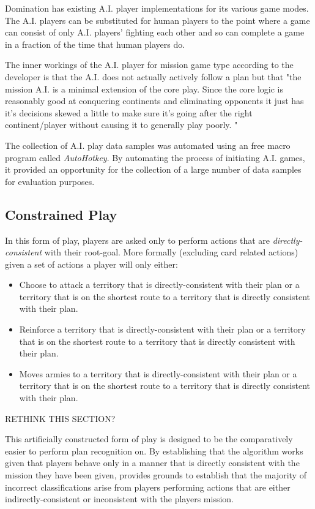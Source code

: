 \documentclass[parskip]{cs4rep}
\begin{document}
Domination has existing A.I. player implementations for its various game modes. The A.I. players can be substituted for human players to the point where a game can consist of only A.I. players' fighting each other and so can complete a game in a fraction of the time that human players do. 

The inner workings of the A.I. player for mission game type according to the developer is that the A.I. does not actually actively follow a plan but that "the mission A.I. is a minimal extension of the core play. Since the core logic is reasonably good at conquering continents and eliminating opponents it just has it's decisions skewed a little to make sure it's going after the right continent/player without causing it to generally play poorly. "

The collection of A.I. play data samples was automated using an free macro program called \textit{AutoHotkey}. By automating the process of initiating A.I. games, it provided an opportunity for the collection of a large number of data samples for evaluation purposes. 

\subsection{Constrained Play}

In this form of play, players are asked only to perform actions that are \textit{directly-consistent} with their root-goal.  More formally (excluding card related actions) given a set of actions a player will only either:

\begin{itemize}
\item
Choose to attack a territory that is directly-consistent with their plan or a territory that is on the shortest route to a territory that is directly consistent with their plan.
\item
Reinforce a territory that is directly-consistent with their plan or a territory that is on the shortest route to a territory that is directly consistent with their plan.
\item
Moves armies to a territory that is directly-consistent with their plan or a territory that is on the shortest route to a territory that is directly consistent with their plan.
\end{itemize}

RETHINK THIS SECTION?

This artificially constructed form of play is designed to be the comparatively easier to perform plan recognition on. By establishing that the algorithm works given that players behave only in a manner that is directly consistent with the mission they have been given, provides grounds to establish that the majority of incorrect classifications arise from players performing actions that are either indirectly-consistent or inconsistent with the players mission.
\end{document}
